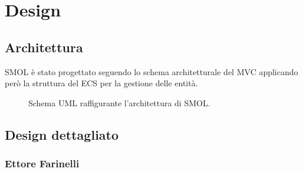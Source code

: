 \documentclass[a4paper,12pt]{report}
\begin{document}
\chapter{Design}

\section{Architettura}
SMOL è stato progettato seguendo lo schema architetturale del \textsc{MVC} applicando però la struttura del \textsc{ECS} per la gestione 
delle entità.

\begin{figure}[h]
\centering{}
\caption{Schema UML raffigurante l'architettura di SMOL.}
\label{img:goodarch}
\end{figure}

\section{Design dettagliato}

\subsection*{Ettore Farinelli}
\end{document}
